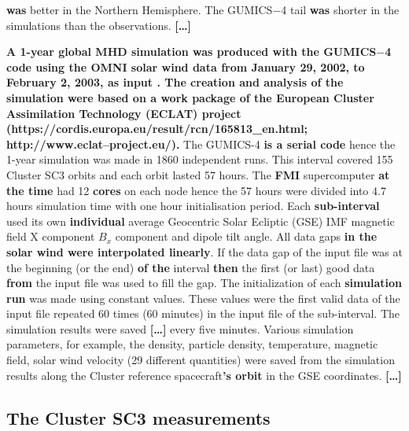 \documentclass[linenumbers,draft]{agujournal}
\begin{document}
\textbf{was} better in the Northern Hemisphere. The GUMICS$-$4 tail \textbf{was} shorter in the simulations than the observations. \textbf{[\dots]}

\textbf{A 1-year global MHD simulation was produced with the GUMICS$-$4 code using the OMNI solar wind data from January 29, 2002, to February 2, 2003, as input \citep{facsko16:_one_earth}. The creation and analysis of the simulation were based on a work package of the European Cluster Assimilation Technology (ECLAT) project (https://cordis.europa.eu/result/rcn/165813\_en.html; http://www.eclat--project.eu/).} The GUMICS-4 \textbf{is a serial code} \citep{janhunen12:_gumic_mhd} hence the 1-year simulation was made in 1860 independent runs. This interval covered 155 Cluster SC3 orbits and each orbit lasted 57 hours. The \textbf{FMI} supercomputer \textbf{at the time} had 12 \textbf{cores} on each node hence the 57 hours were divided into 4.7 hours simulation time with one hour initialisation period. Each \textbf{sub-interval} used its own \textbf{individual} average Geocentric Solar Ecliptic (GSE) IMF magnetic field X component $B_x$ component and dipole tilt angle. All data gaps \textbf{in the solar wind were interpolated linearly}. If the data gap of the input file was at the beginning (or the end) \textbf{of the} interval \textbf{then} the first (or last) good data \textbf{from} the input file was used to fill the gap. The initialization of each \textbf{simulation run} was made using constant values. These values were the first valid data of the input file repeated 60 times (60 minutes) in the input file of the sub-interval. The simulation results were saved \textbf{[\dots]} every five minutes. Various simulation parameters, for example, the density, particle density, temperature, magnetic field, solar wind velocity (29 different quantities) were saved from the simulation results along the Cluster reference spacecraft\textbf{'s orbit} in the GSE coordinates. \textbf{[\dots]}

\subsection{The Cluster SC3 measurements}
\label{sec:cluster}
\end{document}
